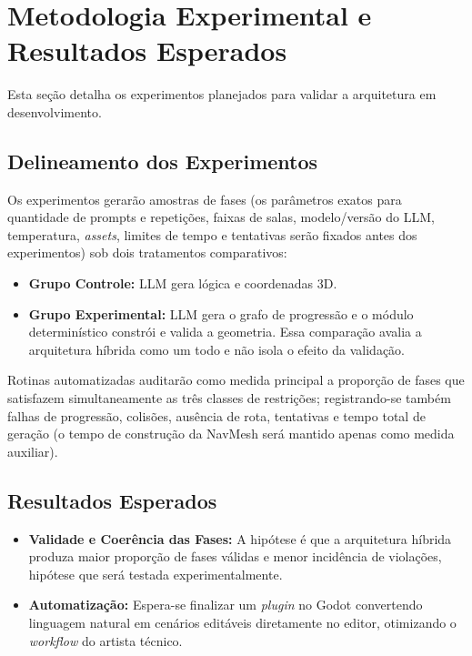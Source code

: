 \documentclass[
  12pt,
  a4paper,
  oneside,
  article,
  brazil
]{abntex2}
\begin{document}
\section{Metodologia Experimental e Resultados Esperados}

Esta seção detalha os experimentos planejados para validar a arquitetura em desenvolvimento.

\subsection{Delineamento dos Experimentos}

Os experimentos gerarão amostras de fases (os parâmetros exatos para quantidade de prompts e repetições, faixas de salas, modelo/versão do LLM, temperatura, \textit{assets}, limites de tempo e tentativas serão fixados antes dos experimentos) sob dois tratamentos comparativos:

\begin{itemize}[leftmargin=*]
  \item \textbf{Grupo Controle:} LLM gera lógica e coordenadas 3D.
  \item \textbf{Grupo Experimental:} LLM gera o grafo de progressão e o módulo determinístico constrói e valida a geometria. Essa comparação avalia a arquitetura híbrida como um todo e não isola o efeito da validação.
\end{itemize}

Rotinas automatizadas auditarão como medida principal a proporção de fases que satisfazem simultaneamente as três classes de restrições; registrando-se também falhas de progressão, colisões, ausência de rota, tentativas e tempo total de geração (o tempo de construção da NavMesh será mantido apenas como medida auxiliar).

\subsection{Resultados Esperados}

\begin{itemize}[leftmargin=*]
    \item \textbf{Validade e Coerência das Fases:} A hipótese é que a arquitetura híbrida produza maior proporção de fases válidas e menor incidência de violações, hipótese que será testada experimentalmente.
    \item \textbf{Automatização:} Espera-se finalizar um \textit{plugin} no Godot convertendo linguagem natural em cenários editáveis diretamente no editor, otimizando o \textit{workflow} do artista técnico.
\end{itemize}
\end{document}
